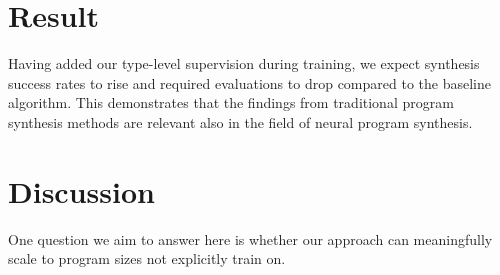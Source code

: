 \documentclass{article}
\begin{document}


\section{Result} %

Having added our type-level supervision during training, we expect synthesis success rates to rise and required evaluations to drop compared to the baseline algorithm.
This demonstrates that the findings from traditional program synthesis methods are relevant also in the field of neural program synthesis.



\section{Discussion} %

One question we aim to answer here is whether our approach can meaningfully scale to program sizes not explicitly train on.
\end{document}
